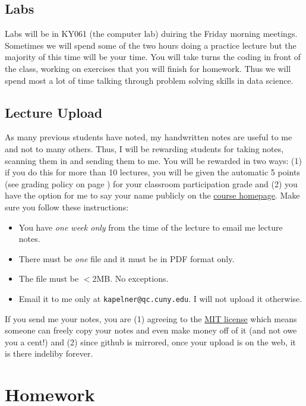 \documentclass[12pt]{article}
\newcommand{\coursewebpage}{\href{https://github.com/kapelner/QC_Math_390.4_Spring_2020}{course homepage}}
\begin{document}
\subsection*{Labs}

Labs  will be in KY061 (the computer lab) duiring the Friday morning meetings. Sometimes we will spend some of the two hours doing a practice lecture but the majority of this time will be your time. You will take turns  the coding in front of the class, working on exercises that you will finish for homework. Thus we will spend most a lot of time talking through problem solving skills in data science.


\subsection*{Lecture Upload}

As many previous students have noted, my handwritten notes are useful to me and not to many others. Thus, I will be rewarding students for taking notes, scanning them in and sending them to me. You will be rewarded in two ways: (1) if you do this for more than 10 lectures, you will be given the automatic 5 points (see grading policy on page \pageref{sec:grading}) for your classroom participation grade and (2) you have the option for me to say your name publicly on the \coursewebpage. Make sure you follow these instructions:

\begin{itemize}
\item You have \emph{one week only} from the time of the lecture to email me lecture notes.
\item There must be \emph{one} file and it must be in PDF format only.
\item The file must be $<$2MB. No exceptions.
\item Email it to me only at \texttt{kapelner@qc.cuny.edu}. I will not upload it otherwise.
\end{itemize}

If you send me your notes, you are (1) agreeing to the \href{https://github.com/kapelner/QC_Math_390.4_Spring_2020/blob/master/LICENSE}{MIT license} which means someone can freely copy your notes and even make money off of it (and not owe you a cent!) and (2) since github is mirrored, once your upload is on the web, it is there indeliby forever. 

\section*{Homework}
\end{document}
